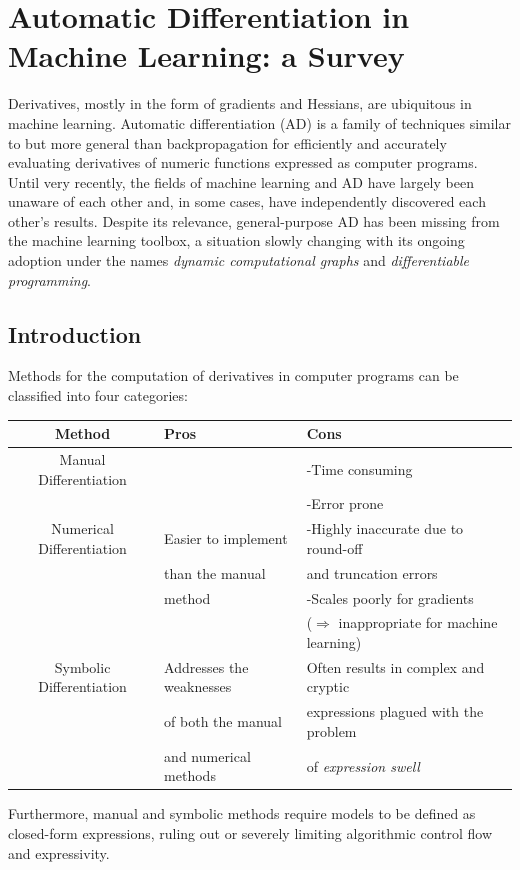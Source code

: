 \section{Automatic Differentiation in Machine Learning: a Survey}
Derivatives, mostly in the form of gradients and Hessians, are ubiquitous in machine learning. Automatic differentiation (AD) is a family of techniques similar to but more general than backpropagation for efficiently and accurately evaluating derivatives of numeric functions expressed as computer programs. Until
very recently, the fields of machine learning and AD have largely been unaware of each other and, in some cases, have independently discovered each other’s results. Despite its relevance, general-purpose AD has been missing from the machine learning toolbox, a situation slowly changing with its ongoing adoption under the names \emph{dynamic computational graphs} and \emph{differentiable programming}.

\subsection{Introduction}
Methods for the computation of derivatives in computer programs can be classified into four categories:
\begin{center}
\begin{tabular}{|c|l|l|} 
\hline
 Method & Pros & Cons\\
\hline
 Manual Differentiation & & -Time consuming \\ 
 & & -Error prone\\ \hline
 Numerical Differentiation& Easier to implement & -Highly inaccurate due to round-off\\
 & than the manual  & and truncation errors\\
 & method & -Scales poorly for gradients\\ 
 & & ($\Rightarrow$ inappropriate for machine learning) \\ \hline
 Symbolic Differentiation & Addresses the weaknesses & Often results in complex and cryptic  \\ 
 & of both the manual & expressions plagued with the problem \\ 
 & and  numerical methods & of \emph{expression swell}\\ \hline
\end{tabular}
\end{center}
\vspace{5mm}
\noindent Furthermore, manual and symbolic methods require models to be defined as closed-form expressions, ruling out or severely limiting algorithmic control flow and expressivity.
\newline 

